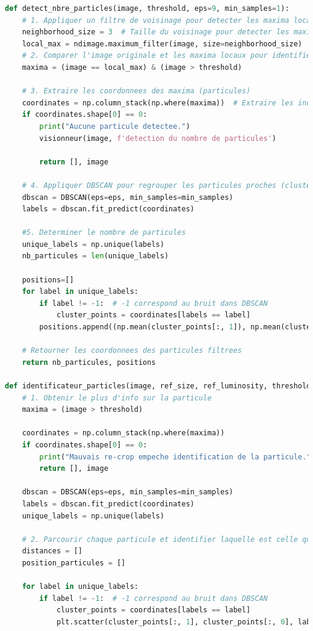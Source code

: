 \documentclass[11pt,letterpaper]{article}
\begin{document}
\begin{lstlisting}[language=python]
def detect_nbre_particles(image, threshold, eps=9, min_samples=1):
    # 1. Appliquer un filtre de voisinage pour detecter les maxima locaux
    neighborhood_size = 3  # Taille du voisinage pour detecter les maxima locaux
    local_max = ndimage.maximum_filter(image, size=neighborhood_size)
    # 2. Comparer l'image originale et les maxima locaux pour identifier les vrais maxima
    maxima = (image == local_max) & (image > threshold)

    # 3. Extraire les coordonnees des maxima (particules)
    coordinates = np.column_stack(np.where(maxima))  # Extraire les indices des pixels maximaux
    if coordinates.shape[0] == 0:
        print("Aucune particule detectee.")
        visionneur(image, f'detection du nombre de particules')

        return [], image

    # 4. Appliquer DBSCAN pour regrouper les particules proches (cluster les maxima detectes)
    dbscan = DBSCAN(eps=eps, min_samples=min_samples)
    labels = dbscan.fit_predict(coordinates)

    #5. Determiner le nombre de particules
    unique_labels = np.unique(labels)
    nb_particules = len(unique_labels)
        
    positions=[]
    for label in unique_labels:
        if label != -1:  # -1 correspond au bruit dans DBSCAN
            cluster_points = coordinates[labels == label]
        positions.append((np.mean(cluster_points[:, 1]), np.mean(cluster_points[:, 0])))

    # Retourner les coordonnees des particules filtrees
    return nb_particules, positions

def identificateur_particles(image, ref_size, ref_luminosity, threshold=50, eps=9, min_samples=1):
    # 1. Obtenir le plus d'info sur la particule
    maxima = (image > threshold)
    
    coordinates = np.column_stack(np.where(maxima))  
    if coordinates.shape[0] == 0:
        print("Mauvais re-crop empeche identification de la particule.")
        return [], image

    dbscan = DBSCAN(eps=eps, min_samples=min_samples)
    labels = dbscan.fit_predict(coordinates)
    unique_labels = np.unique(labels)

    # 2. Parcourir chaque particule et identifier laquelle est celle qu'on suit
    distances = []
    position_particules = []

    for label in unique_labels:
        if label != -1:  # -1 correspond au bruit dans DBSCAN
            cluster_points = coordinates[labels == label]
            plt.scatter(cluster_points[:, 1], cluster_points[:, 0], label=f'Particule {label}')


\end{lstlisting}
\end{document}
